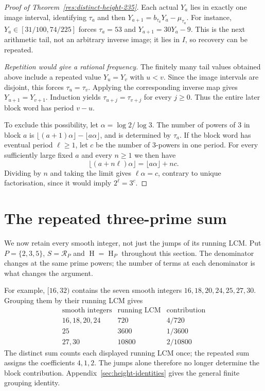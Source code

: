\documentclass[11pt]{article}
\newcommand{\hgt}{\operatorname{H}}
\begin{document}
\begin{proof}[Proof of Theorem~\ref{res:distinct-height-235}]
Each actual $Y_a$ lies in exactly one image interval, identifying
$\tau_a$ and then $Y_{a+1}=b_{\tau_a}Y_a-\mu_{\tau_a}$.
For instance, $Y_a\in[31/100,74/225]$ forces $\tau_a=53$ and
$Y_{a+1}=30Y_a-9$. This is the next arithmetic tail, not an arbitrary
inverse image; it lies in $I$, so recovery can be repeated.

\medskip
\emph{Repetition would give a rational frequency.}
The finitely many tail values obtained above include a repeated value
$Y_u=Y_v$ with $u<v$. Since the image intervals are disjoint, this
forces $\tau_u=\tau_v$. Applying the corresponding inverse map gives
$Y_{u+1}=Y_{v+1}$. Induction yields
$\tau_{u+j}=\tau_{v+j}$ for every $j\ge0$. Thus the entire later block
word has period $v-u$.

To exclude this possibility, let $\alpha=\log2/\log3$. The number of powers
of $3$ in block $a$ is
$\lfloor(a+1)\alpha\rfloor-\lfloor a\alpha\rfloor$, and is determined by
$\tau_a$. If the block word has eventual period $\ell\ge1$, let $c$ be the
number of $3$-powers in one period. For every sufficiently large fixed $a$
and every $n\ge1$ we then have
\[
 \lfloor(a+n\ell)\alpha\rfloor=\lfloor a\alpha\rfloor+nc.
\]
Dividing by $n$ and taking the limit gives $\ell\alpha=c$, contrary to
unique factorisation, since it would imply $2^\ell=3^c$.
\end{proof}

\section{The repeated three-prime sum}
\label{sec:lcm}\label{sec:shell}\label{sec:actual-orbit}
We now retain every smooth integer, not just the jumps of its running
LCM. Put $P=\{2,3,5\}$, $S=\mathcal R_P$ and $\hgt=\hgt_P$ throughout
this section. The denominator changes at the same prime powers; the
number of terms at each denominator is what changes the argument.

For example, $[16,32)$ contains the seven smooth integers
$16,18,20,24,25,27,30$. Grouping them by their running LCM gives
\[
 \begin{array}{c|c|c}
 \text{smooth integers}&\text{running LCM}&\text{contribution}\\\hline
 16,18,20,24&720&4/720\\
 25&3600&1/3600\\
 27,30&10800&2/10800
 \end{array}
\]
The distinct sum counts each displayed running LCM once; the repeated
sum assigns the coefficients $4,1,2$. The jumps alone therefore no longer
determine the block contribution. Appendix~\ref{sec:height-identities}
gives the general finite grouping identity.
\end{document}
